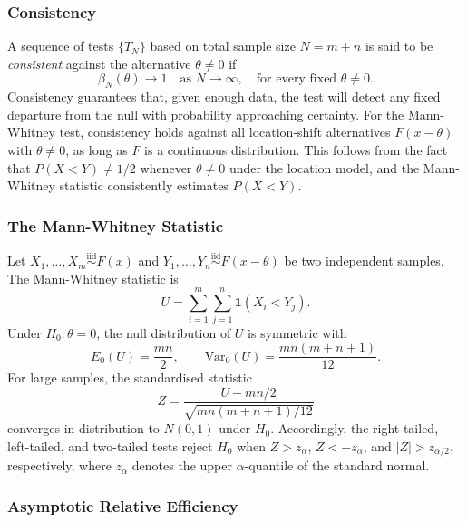 \documentclass[10pt]{article}
\begin{document}
\subsubsection{Consistency}
 
A sequence of tests $\{T_N\}$ based on total sample size $N = m + n$ is said to
be \textit{consistent} against the alternative $\theta \neq 0$ if
\[
    \beta_N(\theta) \to 1 \quad \text{as } N \to \infty,
    \quad \text{for every fixed } \theta \neq 0.
\]
Consistency guarantees that, given enough data, the test will detect any fixed
departure from the null with probability approaching certainty. For the
Mann-Whitney test, consistency holds against all location-shift alternatives
$F(x - \theta)$ with $\theta \neq 0$, as long as $F$ is a continuous
distribution. This follows from the fact that $P(X < Y) \neq 1/2$ whenever
$\theta \neq 0$ under the location model, and the Mann-Whitney statistic
consistently estimates $P(X < Y)$.
 
\subsubsection{The Mann-Whitney Statistic}
 
Let $X_1, \ldots, X_m \overset{\text{iid}}{\sim} F(x)$ and
$Y_1, \ldots, Y_n \overset{\text{iid}}{\sim} F(x - \theta)$ be two independent
samples. The Mann-Whitney statistic is
\[
    U = \sum_{i=1}^{m}\sum_{j=1}^{n} \mathbf{1}(X_i < Y_j).
\]
Under $H_0: \theta = 0$, the null distribution of $U$ is symmetric with
\[
    E_0(U) = \frac{mn}{2}, \qquad
    \text{Var}_0(U) = \frac{mn(m+n+1)}{12}.
\]
For large samples, the standardised statistic
\[
    Z = \frac{U - mn/2}{\sqrt{mn(m+n+1)/12}}
\]
converges in distribution to $N(0,1)$ under $H_0$. Accordingly, the
right-tailed, left-tailed, and two-tailed tests reject $H_0$ when $Z > z_\alpha$,
$Z < -z_\alpha$, and $|Z| > z_{\alpha/2}$, respectively, where $z_\alpha$
denotes the upper $\alpha$-quantile of the standard normal.
 
\subsubsection{Asymptotic Relative Efficiency}
 
\end{document}
